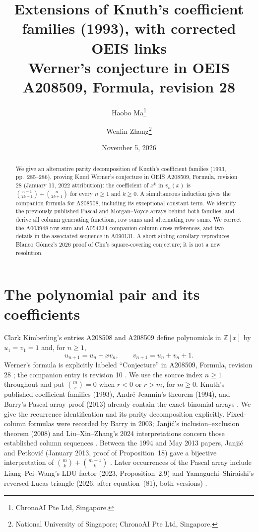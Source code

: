 \documentclass[11pt]{article}
\title{Extensions of Knuth's coefficient families (1993), with corrected OEIS links\protect\\
\large Werner's conjecture in OEIS A208509, Formula, revision 28}
\author{Haobo Ma\thanks{ChronoAI Pte Ltd, Singapore.}\and
Wenlin Zhang\thanks{National University of Singapore; ChronoAI Pte Ltd, Singapore.}}
\date{November 5, 2026}
\begin{document}
\maketitle
\begin{abstract}
We give an alternative parity decomposition of Knuth's coefficient families
(1993, pp.~285--286), proving Knud Werner's conjecture in OEIS A208509,
Formula, revision 28 (January 11, 2022 attribution): the coefficient of $x^k$ in
$v_n(x)$ is $\binom{n-1}{2k+1}+\binom n{2k+1}$ for every $n\geq1$ and $k\geq0$.
A simultaneous induction gives the companion formula for A208508, including
its exceptional constant term. We identify the previously published
Pascal and Morgan--Voyce arrays behind both families, and derive all column generating functions,
row sums and alternating row sums. We correct the A003948 row-sum and
A054334 companion-column cross-references, and two details in the associated
sequence in A090131. A short sibling corollary reproduces Blanco G\'omez's
2026 proof of Chu's square-covering conjecture; it is not a new resolution.
\end{abstract}

\section{The polynomial pair and its coefficients}
Clark Kimberling's entries A208508 and A208509 define polynomials in
$\mathbb Z[x]$ by $u_1=v_1=1$ and, for $n\geq1$,
\begin{equation}\label{eq:pair}
u_{n+1}=u_n+xv_n,\qquad v_{n+1}=u_n+v_n+1.
\end{equation}
Werner's formula is explicitly labeled ``Conjecture'' in A208509,
Formula, revision 28 \cite{a208509}; the companion entry is revision 10
\cite{a208508}. We use the source index $n\geq1$ throughout and put
$\binom mr=0$ when $r<0$ or $r>m$, for $m\geq0$.
Knuth's published coefficient families (1993), Andr\'e-Jeannin's theorem
(1994), and Barry's Pascal-array proof (2013) already contain the exact
binomial arrays \cite{knuth,andre,barry}. We give the recurrence
identification and its parity decomposition explicitly. Fixed-column formulas
were recorded by Barry in 2003; Janji\'c's inclusion--exclusion theorem
(2008) and Liu--Xin--Zhang's 2024 interpretations concern those established
column sequences \cite{columns,janjic,liu}.
Between the 1994 and May 2013 papers, Janji\'c and Petkovi\'c
(January 2013, proof of Proposition~18) gave a bijective interpretation of
$\binom mk+\binom{m+1}k$ \cite{janjic-petkovic}.
Later occurrences of the Pascal array include Liang--Pei--Wang's LDU
factor (2023, Proposition~2.9) and Yamaguchi--Shiraishi's reversed Lucas
triangle (2026, after equation~(81), both versions) \cite{liang,yamaguchi}.
\end{document}
